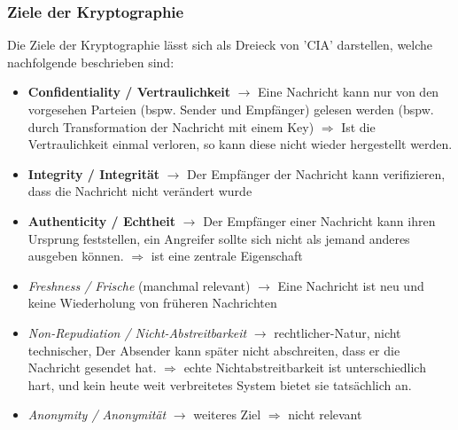 \documentclass{report}
\theoremstyle{definition}
\theoremstyle{example}
\begin{document}
		\subsubsection{Ziele der Kryptographie}
Die Ziele der Kryptographie lässt sich als Dreieck von 'CIA' darstellen, welche nachfolgende beschrieben sind:
\begin{itemize}
	\item \textbf{Confidentiality / Vertraulichkeit} $\rightarrow$ Eine Nachricht kann nur von den vorgesehen Parteien (bspw. Sender und Empfänger) gelesen werden (bspw. durch Transformation der Nachricht mit einem Key) $\Rightarrow$ Ist die Vertraulichkeit einmal verloren, so kann diese nicht wieder hergestellt werden.
	\item \textbf{Integrity / Integrität} $\rightarrow$ Der Empfänger der Nachricht kann verifizieren, dass die Nachricht nicht verändert wurde
	\item \textbf{Authenticity / Echtheit} $\rightarrow$ Der Empfänger einer Nachricht kann ihren Ursprung feststellen, ein Angreifer sollte sich nicht als jemand anderes ausgeben können. $\Rightarrow$ ist eine zentrale Eigenschaft
	\item \textit{Freshness / Frische} (manchmal relevant) $\rightarrow$ Eine Nachricht ist neu und keine Wiederholung von früheren Nachrichten
	\item \textit{Non-Repudiation / Nicht-Abstreitbarkeit} $\rightarrow$ rechtlicher-Natur, nicht technischer, Der Absender kann später nicht abschreiten, dass er die Nachricht gesendet hat. $\Rightarrow$ echte Nichtabstreitbarkeit ist unterschiedlich hart, und kein heute weit verbreitetes System bietet sie tatsächlich an.
	\item \textit{Anonymity / Anonymität} $\rightarrow$ weiteres Ziel $\Rightarrow$ nicht relevant
\end{itemize}
\end{document}
